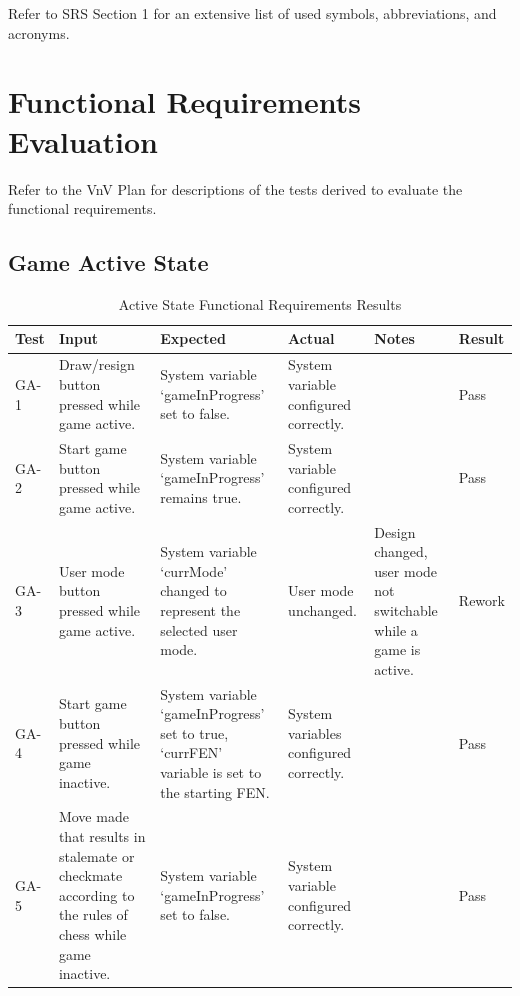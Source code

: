 \documentclass[12pt, titlepage]{article}
\begin{document}
Refer to SRS Section 1 for an extensive list of used symbols, abbreviations, and acronyms.

\newpage

\tableofcontents

\listoftables %

\listoffigures %

\newpage


\section{Functional Requirements Evaluation}
Refer to the VnV Plan for descriptions of the tests derived to evaluate the functional requirements.
\subsection{Game Active State}

\begin{table}[H]
    \centering
        \setlength{\leftmargini}{0cm}
        \begin{tabular}{| >{\centering\arraybackslash}m{1cm} | 
            >{\centering\arraybackslash}m{2.5cm} | 
            >{\centering\arraybackslash}m{4cm} | 
            >{\centering\arraybackslash}m{3cm} |
            >{\centering\arraybackslash}m{3cm} |
            >{\centering\arraybackslash}m{1.5cm} |}
        \hline
        \rowcolor[gray]{0.9}
        Test & Input & Expected & Actual & Notes & Result\\
        \hline
        GA-1 & Draw/resign button pressed while game active. & System variable `gameInProgress' set to false. &  System variable configured correctly. &  & Pass \\
        \hline
        GA-2 & Start game button pressed while game active. & System variable `gameInProgress' remains true. &  System variable configured correctly. &  & Pass \\
        \hline
        GA-3 & User mode button pressed while game active. & System variable `currMode' changed to represent the selected user mode. &  User mode unchanged. & Design changed, user mode not switchable while a game is active. & Rework \\
        \hline
        GA-4 & Start game button pressed while game inactive. & System variable `gameInProgress' set to true, `currFEN' variable is set to the starting FEN. &  System variables configured correctly. &  & Pass \\
        \hline
        GA-5 & Move made that results in stalemate or checkmate according to the rules of chess while game inactive. & System variable `gameInProgress' set to false. &  System variable configured correctly. &  & Pass \\ 
        \hline
        \end{tabular}
    \caption{Active State Functional Requirements Results}
\end{table}
\end{document}
